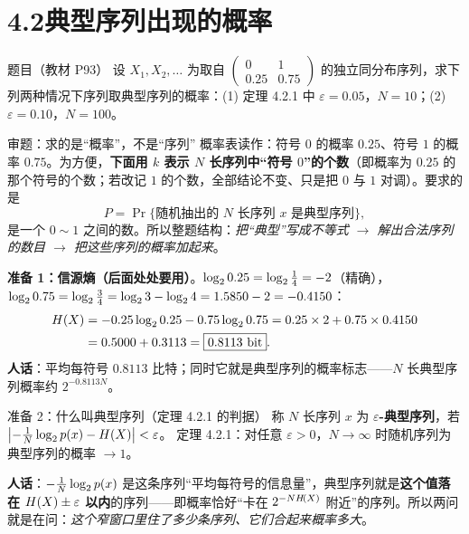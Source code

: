 \documentclass[11pt,a4paper]{ctexart}
\begin{document}
\section{4.2\quad 典型序列出现的概率}

\begin{defbox}{题目（教材 P93）}
设 $X_1,X_2,\dots$ 为取自 $\begin{pmatrix}0&1\\ 0.25&0.75\end{pmatrix}$ 的独立同分布序列，求下列两种情况下序列取典型序列的概率：(1) 定理 4.2.1 中 $\varepsilon=0.05$，$N=10$；(2) $\varepsilon=0.10$，$N=100$。
\end{defbox}

\begin{idea}{审题：求的是“概率”，不是“序列”}
概率表读作：符号 $0$ 的概率 $0.25$、符号 $1$ 的概率 $0.75$。为方便，\textbf{下面用 $k$ 表示 $N$ 长序列中“符号 $0$”的个数}（即概率为 $0.25$ 的那个符号的个数；若改记 $1$ 的个数，全部结论不变、只是把 $0$ 与 $1$ 对调）。要求的是
\[
P=\Pr\{\text{随机抽出的 }N\text{ 长序列 }x\text{ 是典型序列}\},
\]
是一个 $0\sim1$ 之间的数。所以整题结构：\emph{把“典型”写成不等式 $\to$ 解出合法序列的数目 $\to$ 把这些序列的概率加起来}。
\end{idea}

\textbf{准备 1：信源熵（后面处处要用）}。$\log_{2}0.25=\log_{2}\frac14=-2$（精确），$\log_{2}0.75=\log_{2}\frac34=\log_{2}3-\log_{2}4=1.5850-2=-0.4150$：
\begin{align*}
H\!\left(X\right)&=-0.25\log_{2}0.25-0.75\log_{2}0.75
=0.25\times2+0.75\times0.4150\notag\\
&=0.5000+0.3113=\boxed{0.8113\ \text{bit}} .
\end{align*}
\textbf{人话}：平均每符号 $0.8113$ 比特；同时它就是典型序列的概率标志——$N$ 长典型序列概率约 $2^{-0.8113N}$。

\begin{defbox}{准备 2：什么叫典型序列（定理 4.2.1 的判据）}
称 $N$ 长序列 $x$ 为 \textbf{$\varepsilon$-典型序列}，若
$\bigl|-\frac1N\log_{2}p\!\left(x\right)-H\!\left(X\right)\bigr|<\varepsilon$。
定理 4.2.1：对任意 $\varepsilon>0$，$N\to\infty$ 时随机序列为典型序列的概率 $\to1$。
\end{defbox}
\textbf{人话}：$-\frac1N\log_{2}p\!\left(x\right)$ 是这条序列“平均每符号的信息量”，典型序列就是\textbf{这个值落在 $H\!\left(X\right)\pm\varepsilon$ 以内}的序列——即概率恰好“卡在 $2^{-NH\!\left(X\right)}$ 附近”的序列。所以两问就是在问：\emph{这个窄窗口里住了多少条序列、它们合起来概率多大}。
\end{document}
